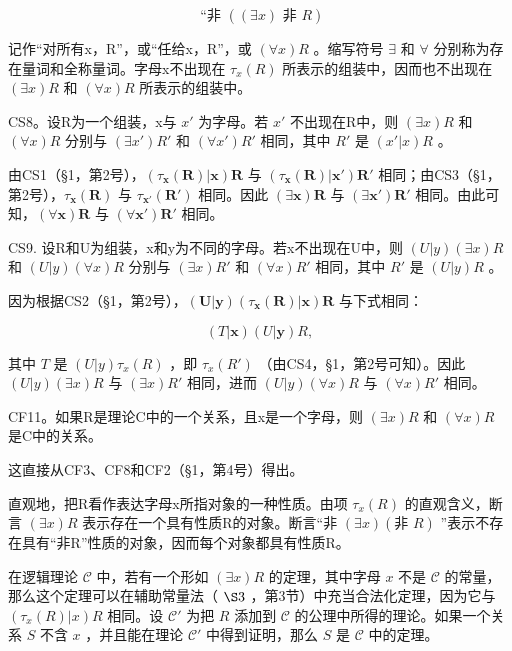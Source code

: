 \[
\text {   ``非   } ((\exists x) \text {   非   } R)
\]

记作“对所有x，R”，或“任给x，R”，或 \((\forall x)R\) 。缩写符号 \(\exists\) 和 \(\forall\) 分别称为存在量词和全称量词。字母x不出现在 \(\tau_{x}(R)\) 所表示的组装中，因而也不出现在 \((\exists x)R\) 和 \((\forall x)R\) 所表示的组装中。

CS8。设R为一个组装，x与 \(x'\) 为字母。若 \(x'\) 不出现在R中，则 \((\exists x)R\) 和 \((\forall x)R\) 分别与 \((\exists x')R'\) 和 \((\forall x')R'\) 相同，其中 \(R'\) 是 \((x'|x)R\) 。

由CS1（§1，第2号），\((\tau_{\mathbf{x}}(\mathbf{R})|\mathbf{x})\mathbf{R}\) 与 \((\tau_{\mathbf{x}}(\mathbf{R})|\mathbf{x}')\mathbf{R}'\) 相同；由CS3（§1，第2号），\(\tau_{\mathbf{x}}(\mathbf{R})\) 与 \(\tau_{\mathbf{x}'}(\mathbf{R}')\) 相同。因此 \((\exists \mathbf{x})\mathbf{R}\) 与 \((\exists \mathbf{x}')\mathbf{R}'\) 相同。由此可知，\((\forall \mathbf{x})\mathbf{R}\) 与 \((\forall \mathbf{x}')\mathbf{R}'\) 相同。

CS9. 设R和U为组装，x和y为不同的字母。若x不出现在U中，则 \((U|y)(\exists x)R\) 和 \((U|y)(\forall x)R\) 分别与 \((\exists x)R'\) 和 \((\forall x)R'\) 相同，其中 \(R'\) 是 \((U|y)R\) 。

因为根据CS2（§1，第2号），\((\pmb{U}|\pmb{y})(\tau_{\pmb{x}}(\pmb{R})|\pmb{x})\pmb{R}\) 与下式相同：

\[
(T | \boldsymbol {x}) (U | \boldsymbol {y}) R,
\]

其中 \(T\) 是 \((U|y)\tau_x(R)\) ，即 \(\tau_x(R')\) （由CS4，§1，第2号可知）。因此 \((U|y)(\exists x)R\) 与 \((\exists x)R'\) 相同，进而 \((U|y)(\forall x)R\) 与 \((\forall x)R'\) 相同。

CF11。如果R是理论C中的一个关系，且x是一个字母，则 \((\exists x)R\) 和 \((\forall x)R\) 是C中的关系。

这直接从CF3、CF8和CF2（§1，第4号）得出。

直观地，把R看作表达字母x所指对象的一种性质。由项 \(\tau_{x}(R)\) 的直观含义，断言 \((\exists x)R\) 表示存在一个具有性质R的对象。断言“非 \((\exists x)(\text{非 } R)\) ”表示不存在具有“非R”性质的对象，因而每个对象都具有性质R。

在逻辑理论 \(\mathcal{C}\) 中，若有一个形如 \((\exists x)R\) 的定理，其中字母 \(x\) 不是 \(\mathcal{C}\) 的常量，那么这个定理可以在辅助常量法（ \(\S 3\) ，第3节）中充当合法化定理，因为它与 \((\tau_{x}(R)|x)R\) 相同。设 \(\mathcal{C}'\) 为把 \(R\) 添加到 \(\mathcal{C}\) 的公理中所得的理论。如果一个关系 \(S\) 不含 \(x\) ，并且能在理论 \(\mathcal{C}'\) 中得到证明，那么 \(S\) 是 \(\mathcal{C}\) 中的定理。

